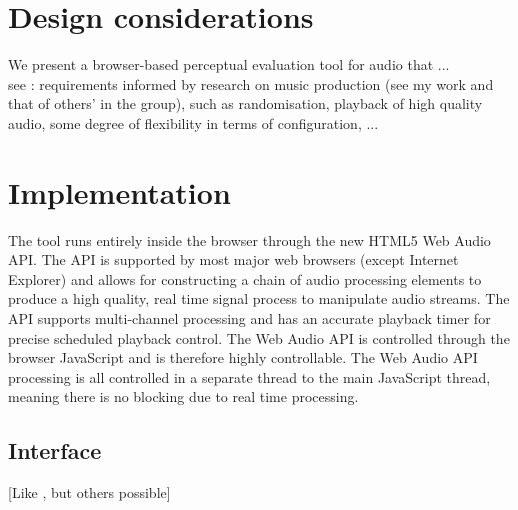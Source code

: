 \documentclass{article}
\begin{document}
\section{Design considerations}\label{sec:designconsiderations}

We present a browser-based perceptual evaluation tool for audio that ... \\

see \cite{deman2014b}: requirements informed by research on music production (see my work and that of others' in the group), such as randomisation, playback of high quality audio, some degree of flexibility in terms of configuration, ... \\


\section{Implementation}\label{sec:implementation}



The tool runs entirely inside the browser through the new HTML5 Web Audio API. The API is supported by most major web browsers (except Internet Explorer) and allows for constructing a chain of audio processing elements to produce a high quality, real time signal process to manipulate audio streams. The API supports multi-channel processing and has an accurate playback timer for precise scheduled playback control. The Web Audio API is controlled through the browser JavaScript and is therefore highly controllable. The Web Audio API processing is all controlled in a separate thread to the main JavaScript thread, meaning there is no blocking due to real time processing. 

\subsection{Interface}\label{sec:interface} %

[Like \cite{deman2014b}, but others possible]
\end{document}
